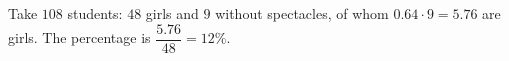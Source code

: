 Take $108$ students: $48$ girls and $9$ without spectacles, of whom $0.64\cdot9=5.76$ are girls. The percentage is $\dfrac{5.76}{48}=\boxed{12\%}$.
